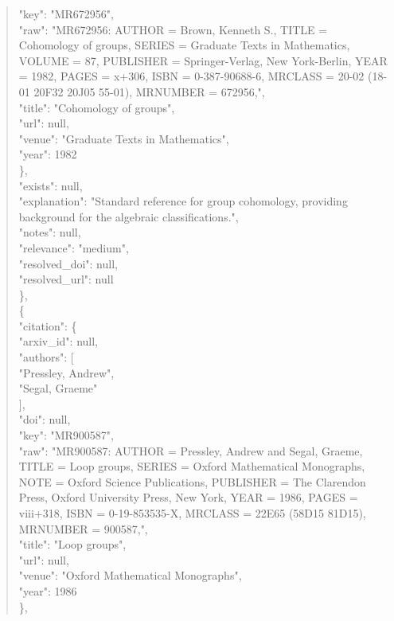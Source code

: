 \documentclass[11pt]{article}
\begin{document}
\begin{quote}
        "key": "MR672956",\\
        "raw": "MR672956: AUTHOR = Brown, Kenneth S., TITLE = Cohomology of groups, SERIES = Graduate Texts in Mathematics, VOLUME = 87, PUBLISHER = Springer-Verlag, New York-Berlin, YEAR = 1982, PAGES = x+306, ISBN = 0-387-90688-6, MRCLASS = 20-02 (18-01 20F32 20J05 55-01), MRNUMBER = 672956,",\\
        "title": "Cohomology of groups",\\
        "url": null,\\
        "venue": "Graduate Texts in Mathematics",\\
        "year": 1982\\
      \},\\
      "exists": null,\\
      "explanation": "Standard reference for group cohomology, providing background for the algebraic classifications.",\\
      "notes": null,\\
      "relevance": "medium",\\
      "resolved\_doi": null,\\
      "resolved\_url": null\\
    \},\\
    \{\\
      "citation": \{\\
        "arxiv\_id": null,\\
        "authors": [\\
          "Pressley, Andrew",\\
          "Segal, Graeme"\\
        ],\\
        "doi": null,\\
        "key": "MR900587",\\
        "raw": "MR900587: AUTHOR = Pressley, Andrew and Segal, Graeme, TITLE = Loop groups, SERIES = Oxford Mathematical Monographs, NOTE = Oxford Science Publications, PUBLISHER = The Clarendon Press, Oxford University Press, New York, YEAR = 1986, PAGES = viii+318, ISBN = 0-19-853535-X, MRCLASS = 22E65 (58D15 81D15), MRNUMBER = 900587,",\\
        "title": "Loop groups",\\
        "url": null,\\
        "venue": "Oxford Mathematical Monographs",\\
        "year": 1986\\
      \},\\

\end{quote}
\end{document}
